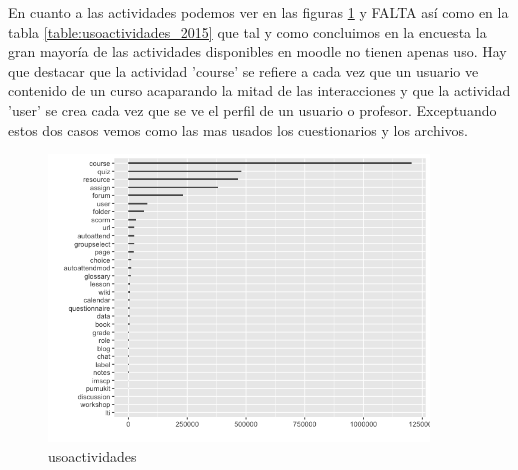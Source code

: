 En cuanto a las actividades podemos ver en las figuras \ref{fig:usoactividades_2015} y FALTA así como en la tabla \ref{table:usoactividades_2015} que tal y como concluimos en la encuesta la gran mayoría de las actividades disponibles en moodle no tienen apenas uso. Hay que destacar que la actividad 'course' se refiere a cada vez que un usuario ve contenido de un curso acaparando la mitad de las interacciones y que la actividad 'user' se crea cada vez que se ve el perfil de un usuario o profesor. Exceptuando estos dos casos vemos como las mas usados los cuestionarios y los archivos.

\begin{figure}[H]
\centering
\includegraphics[width=0.9\textwidth]{../r/usoactividades_2015}
\caption{usoactividades}
\label{fig:usoactividades_2015}
\end{figure}

